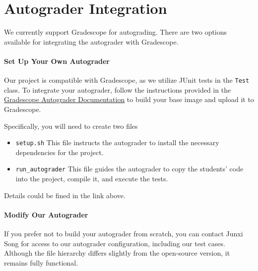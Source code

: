 \pagebreak

\section{Autograder Integration}

We currently support Gradescope for autograding. There are two options available for integrating the autograder with Gradescope.

\paragraph{Set Up Your Own Autograder}
Our project is compatible with Gradescope, as we utilize JUnit tests in the \texttt{Test} class. To integrate your autograder, follow the instructions provided in the \href{https://gradescope-autograders.readthedocs.io/en/latest/getting_started/#setting-up-your-assignment}{Gradescope Autograder Documentation}  to build your base image and upload it to Gradescope.

Specifically, you will need to create two files
\begin{itemize}
    \item
           \texttt{setup.sh} This file instructs the autograder to install the necessary dependencies for the project.
    \item
          \texttt{run\_autograder}  This file guides the autograder to copy the students' code into the project, compile it, and execute the tests. 
\end{itemize}

Details could be fined in the link above.

\paragraph{Modify Our Autograder}
If you prefer not to build your autograder from scratch, you can contact Junxi Song for access to our autograder configuration, including our test cases. Although the file hierarchy differs slightly from the open-source version, it remains fully functional.


%
